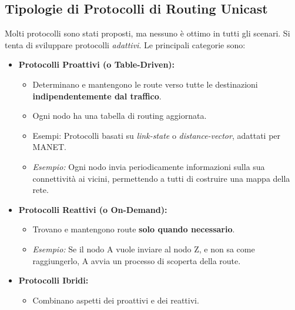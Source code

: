 \subsection{Tipologie di Protocolli di Routing Unicast}
Molti protocolli sono stati proposti, ma nessuno è ottimo in tutti gli scenari. Si tenta di sviluppare protocolli \textit{adattivi}.
Le principali categorie sono:
\begin{itemize}
    \item \textbf{Protocolli Proattivi (o Table-Driven):}
    \begin{itemize}
        \item Determinano e mantengono le route verso tutte le destinazioni \textbf{indipendentemente dal traffico}.
        \item Ogni nodo ha una tabella di routing aggiornata.
        \item Esempi: Protocolli basati su \textit{link-state} o \textit{distance-vector}, adattati per MANET.
        \item \textit{Esempio:} Ogni nodo invia periodicamente informazioni sulla sua connettività ai vicini, permettendo a tutti di costruire una mappa della rete.
    \end{itemize}
    \item \textbf{Protocolli Reattivi (o On-Demand):}
    \begin{itemize}
        \item Trovano e mantengono route \textbf{solo quando necessario}.
        \item \textit{Esempio:} Se il nodo A vuole inviare al nodo Z, e non sa come raggiungerlo, A avvia un processo di scoperta della route.
    \end{itemize}
    \item \textbf{Protocolli Ibridi:}
    \begin{itemize}
        \item Combinano aspetti dei proattivi e dei reattivi.
    \end{itemize}
\end{itemize}

